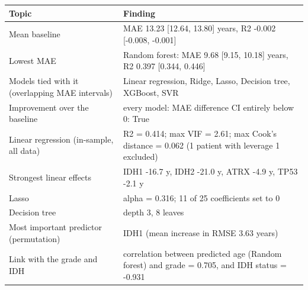 \begin{tabular}{p{4.5cm}p{10.5cm}}
\toprule
\textbf{Topic} & \textbf{Finding} \\
\midrule
Mean baseline & MAE 13.23 [12.64, 13.80] years, R2 -0.002 [-0.008, -0.001] \\
Lowest MAE & Random forest: MAE 9.68 [9.15, 10.18] years, R2 0.397 [0.344, 0.446] \\
Models tied with it (overlapping MAE intervals) & Linear regression, Ridge, Lasso, Decision tree, XGBoost, SVR \\
Improvement over the baseline & every model: MAE difference CI entirely below 0: True \\
Linear regression (in-sample, all data) & R2 = 0.414; max VIF = 2.61; max Cook's distance = 0.062 (1 patient with leverage 1 excluded) \\
Strongest linear effects & IDH1 -16.7 y, IDH2 -21.0 y, ATRX -4.9 y, TP53 -2.1 y \\
Lasso & alpha = 0.316; 11 of 25 coefficients set to 0 \\
Decision tree & depth 3, 8 leaves \\
Most important predictor (permutation) & IDH1 (mean increase in RMSE 3.63 years) \\
Link with the grade and IDH & correlation between predicted age (Random forest) and grade = 0.705, and IDH status = -0.931 \\
\bottomrule
\end{tabular}
